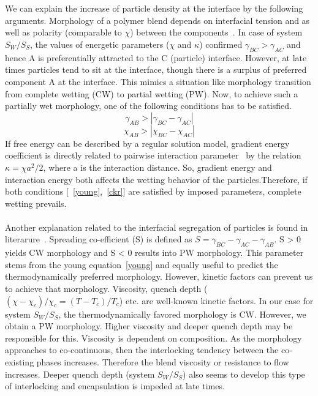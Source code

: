 \documentclass[12pt]{iiscthes}
\theoremstyle{definition}
\theoremstyle{definition}
\theoremstyle{remark}
\begin{document}
\\ \\
 We can explain the increase of particle density at the interface by the following arguments. Morphology of a polymer blend depends on interfacial tension and as well as polarity (comparable to $ \chi $) between the components~\cite{Benderly}. In case of system $S_W/S_S$, the values of energetic parameters ($\chi$ and $\kappa$) confirmed  $\gamma_{BC} > \gamma_{AC}$ and hence A is preferentially attracted to the C (particle) interface. However, at late times particles tend to sit at the interface, though there is a surplus of preferred component A at the interface. This mimics a situation like morphology transition from complete wetting (CW) to partial wetting (PW). Now, to achieve such a partially wet morphology, one of the following conditions has to be satisfied.
\begin{equation}\label{young} \gamma_{AB} > |\gamma_{BC} - \gamma_{AC}| \end{equation}
\begin{equation}\label{ckr}\chi_{AB} > |\chi_{BC} - \chi_{AC}|\end{equation}
 If free energy can be described by a regular solution model, gradient energy coefficient is directly related to pairwise interaction parameter~\cite{Cahn} by the relation $\kappa = \chi a^2/2$, where a is the interaction distance. So, gradient energy and interaction energy both affects the wetting behavior of the particles.Therefore, if both conditions [~\ref{young},~\ref{ckr}] are satisfied by imposed parameters, complete wetting prevails. 
\\ \\
Another explanation related to the interfacial segregation of particles is found in literarure~\cite{Benderly}. Spreading co-efficient (S) is defined as $ S = \gamma_{BC} - \gamma_{AC} - \gamma_{AB} $. S > 0 yields CW morphology and S < 0 results into PW morphology. This parameter stems from the young equation~\ref{young} and equally useful to predict the thermodynamically preferred morphology. However, kinetic factors can prevent us to achieve that morphology. Viscosity, quench depth ($ (\chi - \chi_c)/\chi_c = (T - T_c)/T_c $) etc. are well-known kinetic factors. In our case for system $S_W/S_S$, the thermodynamically favored morphology is CW. However, we obtain a PW morphology. Higher viscosity and deeper quench depth may be responsible for this. Viscosity is dependent on composition. As the morphology approaches to co-continuous, then the interlocking tendency between the co-existing phases increases. Therefore the blend viscosity or resistance to flow increases. Deeper quench depth (system $S_W/S_S$) also seems to develop this type of interlocking and encapsulation is impeded at late times.   
\end{document}
